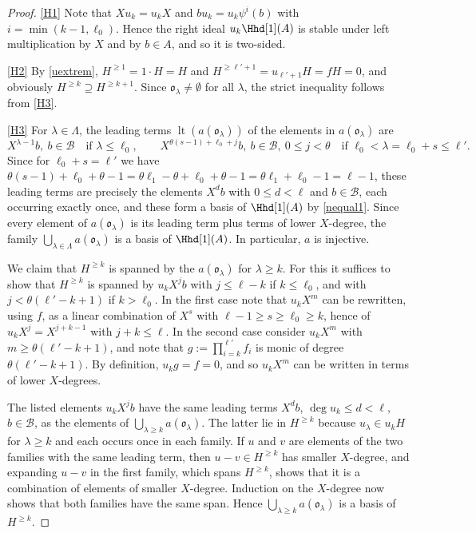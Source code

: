 \documentclass[a4paper,11pt]{amsart}
\newcommand{\lt}{\op{lt}}
\newcommand\cB{\mathcal{B}}
\numberwithin{equation}{subsection}
\theoremstyle{definition}
\theoremstyle{theorem}
\theoremstyle{remark}
\newcommand\olam[1][\lambda]{\mathfrak{o}_{#1}}
\newcommand\op{\operatorname}
\begin{document}
\begin{proof}
  \autoref{H1} Note that $Xu_k=u_kX$ and $bu_k=u_k\psi^{i}(b)$ with
  $i=\min(k-1,\ell_0)$.
  Hence the right ideal $u_k\Hhd[1](A)$ is stable under left multiplication by $X$
  and by $b\in A$, and so it is two-sided.

  \autoref{H2} By \autoref{uextrem}, $H^{\ge1}=1\cdot H=H$ and
  $H^{\ge\ell'+1}=u_{\ell'+1}H=fH=0$, and obviously
  $H^{\ge k}\supseteq H^{\ge k+1}$.  Since $\olam\ne\emptyset$ for all
  $\lambda$, the strict inequality follows from   \autoref{H3}.

  \autoref{H3} For $\lambda\in\Lambda$, the leading terms $\lt(a(\olam))$ of the elements
  in $a(\olam)$ are
  \[
    X^{\lambda-1}b,\ b\in\cB\quad\text{if }\lambda\le\ell_0,
    \qquad
    X^{\theta(s-1)+\ell_0+j}b,\ b\in\cB,\ 0\le j<\theta
    \quad\text{if }\ell_0<\lambda=\ell_0+s\le\ell' .
  \]
  Since for $\ell_0+s=\ell'$ we have $ \theta(s-1)+\ell_0+\theta-1=\theta\ell_1-\theta+\ell_0+\theta-1
    =\theta\ell_1+\ell_0-1=\ell-1$,
  these leading terms are precisely the elements $X^{d}b$ with $0\le d<\ell$
  and $b\in\cB$, each occurring exactly once, and these form a basis of $\Hhd[1](A)$ by
  \autoref{nequal1}. Since every element of $a(\olam)$ is its leading term
  plus terms of lower $X$-degree, the family $\bigcup_{\lambda\in\Lambda}a(\olam)$
 is a basis of $\Hhd[1](A)$. In particular, $a$ is injective.

  We claim that $H^{\ge k}$ is spanned by the $a(\olam)$ for $\lambda\ge k$.
  For this it suffices to show that $H^{\ge k}$ is spanned by $u_kX^{j}b$
  with $j\le\ell-k$ if $k\le\ell_0$, and with $j<\theta(\ell'-k+1)$ if
  $k>\ell_0$.  In the first case note that $u_kX^{m}$ can be rewritten, using
  $f$, as a linear combination of $X^{s}$ with $\ell-1\ge s\ge\ell_0\ge k$,
  hence of $u_kX^{j}=X^{j+k-1}$ with $j+k\le\ell$.  In the second case
  consider $u_kX^{m}$ with $m\ge\theta(\ell'-k+1)$, and note that
  $g:=\prod_{i=k}^{\ell'}f_i$ is monic of degree $\theta(\ell'-k+1)$.  By
  definition, $u_kg=f=0$,
  and so $u_kX^{m}$ can be written in terms of lower $X$-degrees.

The listed elements $u_kX^{j}b$
have the same leading terms $X^{d}b$,
  $\deg u_k\le d<\ell$, $b\in\cB$, as the elements of
  $\bigcup_{\lambda\ge k}a(\olam)$. The latter lie in $H^{\ge k}$ because
  $u_\lambda\in u_kH$ for $\lambda\ge k$ and each occurs once in each family. If $u$
  and $v$ are elements of the two families with the same leading term, then
  $u-v\in H^{\ge k}$ has smaller $X$-degree, and expanding $u-v$ in the first
  family, which spans $H^{\ge k}$, shows that it is a combination of elements
  of smaller $X$-degree. Induction on the $X$-degree now shows that both
  families have the same span. Hence $\bigcup_{\lambda\ge k}a(\olam)$ is a
  basis of $H^{\ge k}$.
\end{proof}
\end{document}
